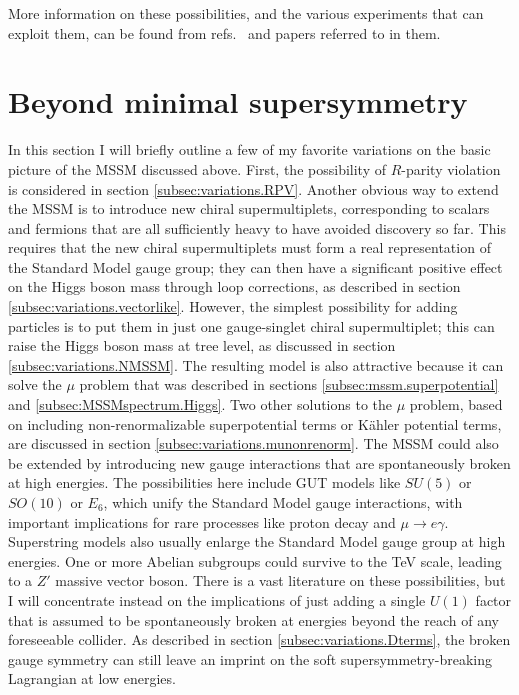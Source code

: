 \documentclass[12pt]{article}
\begin{document}
More information on these possibilities, and the various experiments that 
can exploit them, can be found from refs.~\cite{darkmatterreviews} and 
papers referred to in them.

\section{Beyond minimal supersymmetry}\label{sec:variations}
\setcounter{equation}{0}
\setcounter{figure}{0}
\setcounter{table}{0}
\setcounter{footnote}{1}

In this section I will briefly outline a few of my favorite variations 
on the basic picture of the MSSM discussed above. First, the possibility 
of $R$-parity violation is considered in section 
\ref{subsec:variations.RPV}. Another obvious way to extend the MSSM is 
to introduce new chiral supermultiplets, corresponding to scalars and 
fermions that are all sufficiently heavy to have avoided discovery so 
far. This requires that the new chiral supermultiplets must form a real 
representation of the Standard Model gauge group; they can then have a 
significant positive effect on the Higgs boson mass through loop 
corrections, as described in section \ref{subsec:variations.vectorlike}. 
However, the simplest possibility for adding particles is to put them in 
just one gauge-singlet chiral supermultiplet; this can raise the Higgs 
boson mass at tree level, as discussed in section 
\ref{subsec:variations.NMSSM}. The resulting model is also attractive 
because it can solve the $\mu$ problem that was described in sections 
\ref{subsec:mssm.superpotential} and \ref{subsec:MSSMspectrum.Higgs}. 
Two other solutions to the $\mu$ problem, based on including 
non-renormalizable superpotential terms or K\"ahler potential terms, are 
discussed in section \ref{subsec:variations.munonrenorm}. The MSSM could 
also be extended by introducing new gauge interactions that are 
spontaneously broken at high energies. The possibilities here include 
GUT models like $SU(5)$ or $SO(10)$ or $E_6$, which unify the Standard 
Model gauge interactions, with important implications for rare processes 
like proton decay and $\mu \rightarrow e \gamma$.  Superstring models 
also usually enlarge the Standard Model gauge group at high energies.  
One or more Abelian subgroups could survive to the TeV scale, leading to 
a $Z'$ massive vector boson. There is a vast literature on these 
possibilities, but I will concentrate instead on the implications of 
just adding a single $U(1)$ factor that is assumed to be spontaneously 
broken at energies beyond the reach of any foreseeable collider. As 
described in section \ref{subsec:variations.Dterms}, the broken gauge 
symmetry can still leave an imprint on the soft supersymmetry-breaking 
Lagrangian at low energies.
\end{document}
